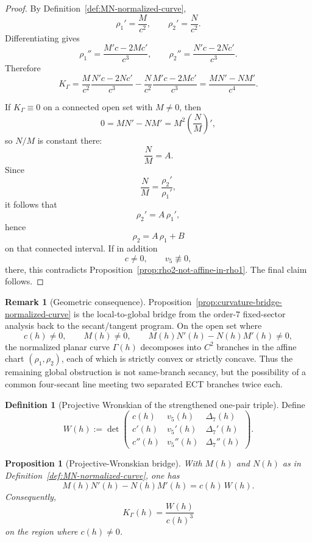 \documentclass[11pt,a4paper]{amsart}
\theoremstyle{plain}
\newtheorem{proposition}[theorem]{Proposition}
\theoremstyle{definition}
\newtheorem{definition}[theorem]{Definition}
\newtheorem{remark}[theorem]{Remark}
\begin{document}
\begin{proof}
By Definition~\ref{def:MN-normalized-curve},
\[
\rho_1'=\frac{M}{c^2},
\qquad
\rho_2'=\frac{N}{c^2}.
\]
Differentiating gives
\[
\rho_1''=\frac{M'c-2Mc'}{c^3},
\qquad
\rho_2''=\frac{N'c-2Nc'}{c^3}.
\]
Therefore
\[
K_\Gamma
=
\frac{M}{c^2}\frac{N'c-2Nc'}{c^3}
-
\frac{N}{c^2}\frac{M'c-2Mc'}{c^3}
=
\frac{MN'-NM'}{c^4}.
\]

If $K_\Gamma\equiv 0$ on a connected open set with $M\neq 0$, then
\[
0=MN'-NM'=M^2\left(\frac{N}{M}\right)',
\]
so $N/M$ is constant there:
\[
\frac{N}{M}=A.
\]
Since
\[
\frac{N}{M}=\frac{\rho_2'}{\rho_1'},
\]
it follows that
\[
\rho_2'=A\,\rho_1',
\]
hence
\[
\rho_2=A\,\rho_1+B
\]
on that connected interval. If in addition
\[
c\neq 0,
\qquad
v_5\not\equiv 0,
\]
there, this contradicts Proposition~\ref{prop:rho2-not-affine-in-rho1}. The
final claim follows.
\end{proof}

\begin{remark}[Geometric consequence]
\label{rem:geometric-consequence-normalized-curve}
Proposition~\ref{prop:curvature-bridge-normalized-curve} is the local-to-global
bridge from the order-$7$ fixed-sector analysis back to the secant/tangent
program. On the open set where
\[
c(h)\neq 0,
\qquad
M(h)\neq 0,
\qquad
M(h)N'(h)-N(h)M'(h)\neq 0,
\]
the normalized planar curve $\Gamma(h)$ decomposes into $C^2$ branches in the
affine chart $(\rho_1,\rho_2)$, each of which is strictly convex or strictly
concave. Thus the remaining global obstruction is not same-branch secancy, but
the possibility of a common four-secant line meeting two separated ECT
branches twice each.
\end{remark}

\begin{definition}[Projective Wronskian of the strengthened one-pair triple]
\label{def:projective-wronskian-c-v5-delta7}
Define
\[
W(h):=
\det\!
\begin{pmatrix}
c(h) & v_5(h) & \Delta_7(h)\\
c'(h) & v_5'(h) & \Delta_7'(h)\\
c''(h) & v_5''(h) & \Delta_7''(h)
\end{pmatrix}.
\]
\end{definition}

\begin{proposition}[Projective-Wronskian bridge]
\label{prop:projective-wronskian-bridge}
With $M(h)$ and $N(h)$ as in
Definition~\ref{def:MN-normalized-curve}, one has
\[
M(h)N'(h)-N(h)M'(h)=c(h)\,W(h).
\]
Consequently,
\[
K_\Gamma(h)=\frac{W(h)}{c(h)^3}
\]
on the region where $c(h)\neq 0$.
\end{proposition}
\end{document}
